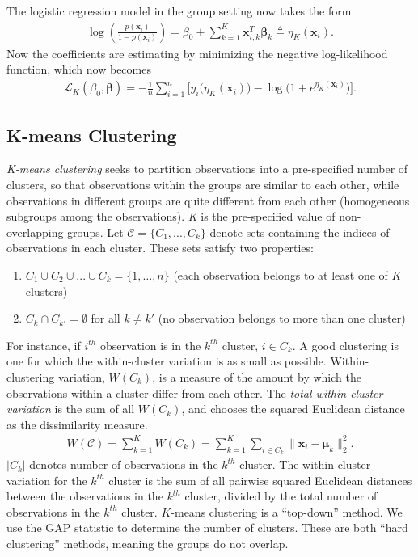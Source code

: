 \documentclass[10pt]{article}
\begin{document}
The logistic regression model in the group setting now takes the form 
\begin{align}
    \label{logreggroup}
        \log \left( \frac{p(\bm{x}_i)}{1 - p(\bm{x}_i)} \right) = \beta_0 + \sum_{k=1}^K \bm{x}_{i,k}^T \bm{\beta}_k \triangleq \eta_K(\bm{x}_i).
\end{align}
Now the coefficients are estimating by minimizing the negative log-likelihood function, which now becomes 
\begin{align}
    \label{negloglikegroup}
        \mathcal{L}_K(\beta_0, \bm{\beta}) = - \frac{1}{n} \sum_{i = 1}^n \Big[ y_i\big(\eta_K(\bm{x}_i)\big) - \log \big(1 + e^{\eta_K(\bm{x}_i)}  \big) \Big].
\end{align}


\subsection{K-means Clustering}

\emph{K-means clustering} seeks to partition observations into a pre-specified number of clusters, so that observations within the groups are similar to each other, while observations in different groups are quite different from each other (homogeneous subgroups among the observations). \emph{K} is the pre-specified value of non-overlapping groups. Let $\mathcal{C} = \{ C_{1},..., C_{k} \}$ denote sets containing the indices of observations in each cluster. These sets satisfy two properties:

\begin{enumerate}
    \item $C_{1} \cup C_{2} \cup ... \cup C_{k} = \{1,\ldots,n\}$  (each observation belongs to at least one of $K$ clusters)
    \item $C_{k} \cap C_{k'} = \emptyset  $ for all $k \neq k'$ (no observation belongs to more than one cluster)
\end{enumerate}

For instance, if $i^{th}$ observation is in the $k^{th}$ cluster, $i \in C_{k}$. A good clustering is one for which the within-cluster variation is as small as possible. Within-clustering variation, $W(C_{k})$, is a measure of the amount by which the observations within a cluster differ from each other. The \textit{total within-cluster variation} is the sum of all $W(C_k)$, and chooses the squared Euclidean distance as the dissimilarity measure.
    \begin{align}
    \label{kmeans}
        W(\mathcal{C}) = \sum_{k=1}^K W(C_k) = \sum_{k=1}^K \sum_{i \in C_k} \| \bm{x}_i - \bm{\mu}_k \|_2^2.
    \end{align}
$|C_{k}|$ denotes number of observations in the $k^{th}$ cluster. The within-cluster variation for the $k^{th}$ cluster is the sum of all pairwise squared Euclidean distances between the observations in the $k^{th}$ cluster, divided by the total number of observations in the $k^{th}$ cluster. $K$-means clustering is a ``top-down'' method. We use the GAP statistic \cite{tibshirani2001estimating} to determine the number of clusters. These are both ``hard clustering'' methods, meaning the groups do not overlap. 
\end{document}
